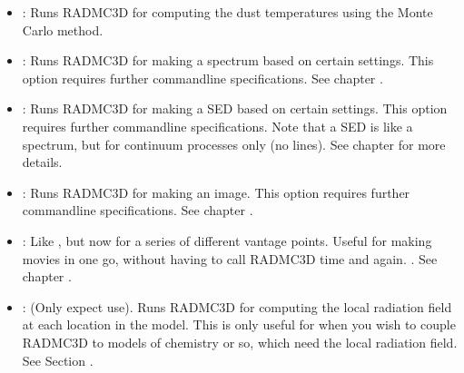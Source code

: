 \documentclass[letterpaper,10pt,english]{sphinxmanual}
\begin{document}
\begin{itemize}
\item {} 
: Runs RADMC\sphinxhyphen{}3D for computing the dust
temperatures using the Monte Carlo method.

\item {} 
: Runs RADMC\sphinxhyphen{}3D for making a spectrum based
on certain settings. This option requires further command\sphinxhyphen{}line
specifications. See chapter {\hyperref[\detokenize{imagesspectra:chap-images-spectra}]{}}.

\item {} 
: Runs RADMC\sphinxhyphen{}3D for making a SED based on certain
settings. This option requires further command\sphinxhyphen{}line specifications.  Note
that a SED is like a spectrum, but for continuum processes only (no
lines). See chapter {\hyperref[\detokenize{imagesspectra:chap-images-spectra}]{}} for more details.

\item {} 
: Runs RADMC\sphinxhyphen{}3D for making an image.  This option
requires further command\sphinxhyphen{}line specifications. See chapter
{\hyperref[\detokenize{imagesspectra:chap-images-spectra}]{}}.

\item {} 
: Like , but now for a series of different
vantage points. Useful for making movies in one go, without having to call
RADMC\sphinxhyphen{}3D time and again. . See chapter {\hyperref[\detokenize{imagesspectra:chap-images-spectra}]{}}.

\item {} 
: (Only expect use). Runs RADMC\sphinxhyphen{}3D for computing
the local radiation field at each location in the model. This is only
useful for when you wish to couple RADMC\sphinxhyphen{}3D to models of chemistry or so,
which need the local radiation field. See Section
{\hyperref[\detokenize{dustradtrans:sec-dust-monochromatic-monte-carlo}]{}}.

\end{itemize}
\end{document}
